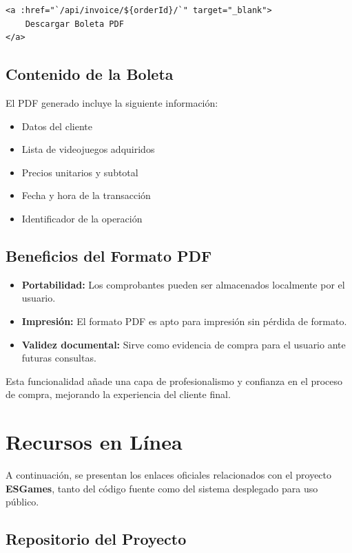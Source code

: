 \documentclass{article}
\begin{document}
\begin{verbatim}
<a :href="`/api/invoice/${orderId}/`" target="_blank">
    Descargar Boleta PDF
</a>
\end{verbatim}

\subsection{Contenido de la Boleta}

El PDF generado incluye la siguiente información:

\begin{itemize}
    \item Datos del cliente 
    \item Lista de videojuegos adquiridos
    \item Precios unitarios y subtotal
    \item Fecha y hora de la transacción
    \item Identificador de la operación
\end{itemize}

\subsection{Beneficios del Formato PDF}

\begin{itemize}
    \item \textbf{Portabilidad:} Los comprobantes pueden ser almacenados localmente por el usuario.
    \item \textbf{Impresión:} El formato PDF es apto para impresión sin pérdida de formato.
    \item \textbf{Validez documental:} Sirve como evidencia de compra para el usuario ante futuras consultas.
\end{itemize}

Esta funcionalidad añade una capa de profesionalismo y confianza en el proceso de compra, mejorando la experiencia del cliente final.


\section{Recursos en Línea}

A continuación, se presentan los enlaces oficiales relacionados con el proyecto \textbf{ESGames}, tanto del código fuente como del sistema desplegado para uso público.

\subsection{Repositorio del Proyecto}
\end{document}
